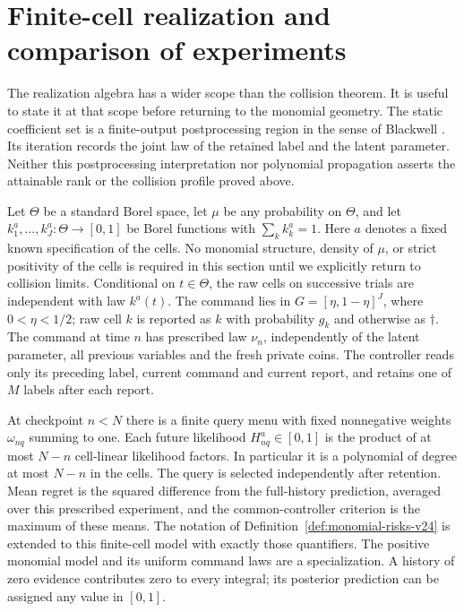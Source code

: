 \section{Finite-cell realization and comparison of experiments}
\label{sec:v33-moments}

The realization algebra has a wider scope than the collision theorem.
It is useful to state it at that scope before returning to the monomial
geometry. The static coefficient set is a finite-output postprocessing
region in the sense of Blackwell \cite{Blackwell1953}. Its iteration
records the joint law of the retained label and the latent parameter.
Neither this postprocessing interpretation nor polynomial propagation
asserts the attainable rank or the collision profile proved above.

Let $\Theta$ be a standard Borel space, let $\mu$ be any probability
on $\Theta$, and let $k_1^a,\ldots,k_J^a:\Theta\to[0,1]$ be Borel
functions with $\sum_k k_k^a=1$. Here $a$ denotes a fixed known
specification of the cells. No monomial structure, density of $\mu$,
or strict positivity of the cells is required in this section until
we explicitly return to collision limits. Conditional on $t\in\Theta$,
the raw cells on successive trials are independent with law $k^a(t)$.
The command lies
in $G=[\eta,1-\eta]^J$, where $0<\eta<1/2$; raw cell $k$ is
reported as $k$ with probability $g_k$ and otherwise as $\dagger$.
The command at time $n$ has prescribed law $\nu_n$, independently of
the latent parameter, all previous variables and the fresh private coins.
The controller reads only its preceding label, current command and
current report, and retains one of $M$ labels after each report.

At checkpoint $n<N$ there is a finite query menu with fixed
nonnegative weights $\omega_{nq}$ summing to one. Each future
likelihood $H^a_{nq}\in[0,1]$ is the product of at most $N-n$
cell-linear likelihood factors. In particular it is a polynomial of
degree at most $N-n$ in the cells. The query is selected independently
after retention. Mean regret is the squared difference from the
full-history prediction, averaged over this prescribed experiment,
and the common-controller criterion is the maximum of these means.
The notation of Definition~\ref{def:monomial-risks-v24} is extended
to this finite-cell model with exactly those quantifiers. The positive
monomial model and its uniform command laws are a specialization.
A history of zero evidence contributes zero to every integral; its
posterior prediction can be assigned any value in $[0,1]$.

